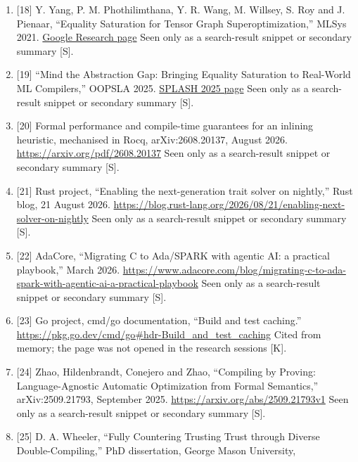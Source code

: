 \documentclass[10pt,letterpaper]{article}
\begin{document}
\begin{enumerate}
  (accepted RFC).
  \url{https://github.com/bytecodealliance/rfcs/blob/main/accepted/cranelift-egraph.md}
  Cited from memory; the page was not opened in the research sessions
  {[}K{]}.
\item
  {[}18{]} Y. Yang, P. M. Phothilimthana, Y. R. Wang, M. Willsey, S. Roy
  and J. Pienaar, ``Equality Saturation for Tensor Graph
  Superoptimization,'' MLSys 2021.
  \href{https://research.google/pubs/equality-saturation-for-tensor-graph-superoptimization/}{Google
  Research page} Seen only as a search-result snippet or secondary
  summary {[}S{]}.
\item
  {[}19{]} ``Mind the Abstraction Gap: Bringing Equality Saturation to
  Real-World ML Compilers,'' OOPSLA 2025.
  \href{https://2025.splashcon.org/details/OOPSLA/42/Mind-the-Abstraction-Gap-Bringing-Equality-Saturation-to-Real-World-ML-Compilers}{SPLASH
  2025 page} Seen only as a search-result snippet or secondary summary
  {[}S{]}.
\item
  {[}20{]} Formal performance and compile-time guarantees for an
  inlining heuristic, mechanised in Rocq, arXiv:2608.20137, August 2026.
  \url{https://arxiv.org/pdf/2608.20137} Seen only as a search-result
  snippet or secondary summary {[}S{]}.
\item
  {[}21{]} Rust project, ``Enabling the next-generation trait solver on
  nightly,'' Rust blog, 21 August 2026.
  \url{https://blog.rust-lang.org/2026/08/21/enabling-next-solver-on-nightly}
  Seen only as a search-result snippet or secondary summary {[}S{]}.
\item
  {[}22{]} AdaCore, ``Migrating C to Ada/SPARK with agentic AI: a
  practical playbook,'' March 2026.
  \url{https://www.adacore.com/blog/migrating-c-to-ada-spark-with-agentic-ai-a-practical-playbook}
  Seen only as a search-result snippet or secondary summary {[}S{]}.
\item
  {[}23{]} Go project, cmd/go documentation, ``Build and test caching.''
  \url{https://pkg.go.dev/cmd/go\#hdr-Build_and_test_caching} Cited from
  memory; the page was not opened in the research sessions {[}K{]}.
\item
  {[}24{]} Zhao, Hildenbrandt, Conejero and Zhao, ``Compiling by
  Proving: Language-Agnostic Automatic Optimization from Formal
  Semantics,'' arXiv:2509.21793, September 2025.
  \url{https://arxiv.org/abs/2509.21793v1} Seen only as a search-result
  snippet or secondary summary {[}S{]}.
\item
  {[}25{]} D. A. Wheeler, ``Fully Countering Trusting Trust through
  Diverse Double-Compiling,'' PhD dissertation, George Mason University,

\end{enumerate}
\end{document}
